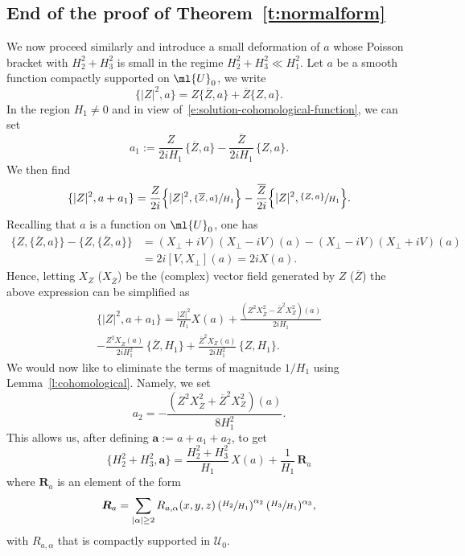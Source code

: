 \documentclass[10pt]{amsart}
\theoremstyle{plain}
\theoremstyle{definition}
\theoremstyle{remark}
\begin{document}
\subsection{End of the proof of Theorem~\ref{t:normalform}} We now proceed similarly and introduce a small deformation of $a$ whose Poisson bracket with $H_2^2+H_3^2$ is small in the regime $H_2^2+H_3^2\ll H_1^2$. Let $a$ be a smooth function compactly supported on $\ml{U}_0$, we write
\[
\{|Z|^2,a\}=Z\{\overline{Z},a\}+\overline{Z}\{Z,a\}.
\]
In the region $H_1\neq 0$ and in view of~\eqref{e:solution-cohomological-function}, we can set
\[
a_1:=\frac{Z}{2iH_1}\,\{\overline{Z},a\}-\frac{\overline{Z}}{2iH_1}\,\{Z,a\}.
\]
We then find
\[
\{|Z|^2,a + a_1\}=\frac{Z}{2i}\Bigl\{|Z|^2,\sfrac{\{\overline{Z},a\}}{H_1}\Bigr\}-\frac{\overline{Z}}{2i}\Bigl\{|Z|^2,\sfrac{\{Z,a\}}{H_1}\Bigr\}.
\]
Recalling that $a$ is a function on $\ml{U}_0$, one has
\begin{align*}
\{Z,\{\overline{Z},a\}\}-\{Z,\{\overline{Z},a\}\}&=(X_\perp+iV)(X_\perp-iV)(a)-(X_\perp-iV)(X_\perp+iV)(a)\\
&=2i[V,X_\perp](a)=2iX(a).
\end{align*}
Hence, letting $X_{Z}$ (\resp $X_{\overline{Z}}$) be the (complex) vector field generated by $Z$ (\resp $\overline{Z}$) the above expression can be simplified as
\begin{multline*}
\{|Z|^2,a+a_1\}=\frac{|Z|^2}{H_1}X(a)+\frac{(Z^2X_{\overline{Z}}^2-\overline{Z}^2X_Z^2)(a)}{2iH_1}\\[-5pt]
-\frac{Z^2X_{\overline{Z}}(a)}{2iH_1^2}\,\{\overline{Z},H_1\}+\frac{\overline{Z}^2X_Z(a)}{2iH_1^2}\,\{Z,H_1\}.
\end{multline*}
We would now like to eliminate the terms of magnitude $1/H_1$ using Lemma~\ref{l:cohomological}. Namely, we set
\[
a_2=-\frac{(Z^2X_{\overline{Z}}^2+\overline{Z}^2X_Z^2)(a)}{8H_1^2}.
\]
This allows us, after defining $\boldsymbol{a}:=a+a_1 + a_2$, to get
\begin{equation}\label{e:poisson-bracket-a-normal-form}
\{H_2^2+H_3^2,\boldsymbol{a}\}=\frac{H_2^2+H_3^2}{H_1}\,X(a)+\frac{1}{H_1}\,\boldsymbol{R}_a
\end{equation}
where $\boldsymbol{R}_a$ is an element of the form
\[
\boldsymbol{R}_a=\sum_{|\alpha|\geq 2}R_{a,\alpha}(x,y,z)\left(\sfrac{H_2}{H_1}\right)^{\alpha_2}(\sfrac{H_3}{H_1})^{\alpha_3},
\]
with $R_{a,\alpha}$ that is compactly supported in $\mathcal{U}_0$.
\end{document}
